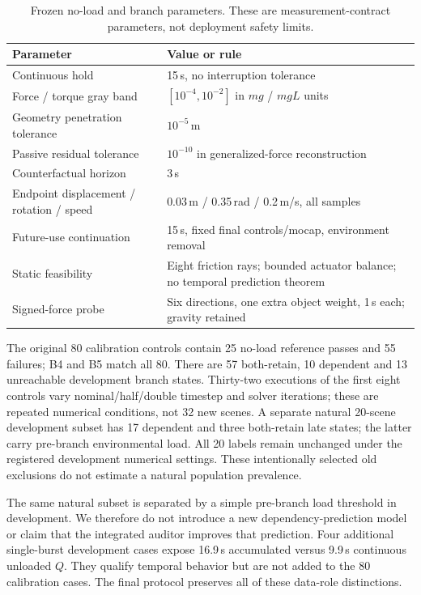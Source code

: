 \begin{table}[h]
\centering\small
\caption{Frozen no-load and branch parameters. These are measurement-contract
parameters, not deployment safety limits.}
\begin{tabularx}{\linewidth}{l Y}
\toprule
Parameter & Value or rule\\
\midrule
Continuous hold & 15\,s, no interruption tolerance\\
Force / torque gray band & $[10^{-4},10^{-2}]$ in $mg$ / $mgL$ units\\
Geometry penetration tolerance & $10^{-5}$\,m\\
Passive residual tolerance & $10^{-10}$ in generalized-force reconstruction\\
Counterfactual horizon & 3\,s\\
Endpoint displacement / rotation / speed & 0.03\,m / 0.35\,rad / 0.2\,m/s, all samples\\
Future-use continuation & 15\,s, fixed final controls/mocap, environment removal\\
Static feasibility & Eight friction rays; bounded actuator balance; no temporal prediction theorem\\
Signed-force probe & Six directions, one extra object weight, 1\,s each; gravity retained\\
\bottomrule
\end{tabularx}
\end{table}

The original 80 calibration controls contain 25 no-load reference passes and
55 failures; B4 and B5 match all 80. There are 57 both-retain, 10 dependent and
13 unreachable development branch states. Thirty-two executions of the first
eight controls vary nominal/half/double timestep and solver iterations; these
are repeated numerical conditions, not 32 new scenes. A separate natural
20-scene development subset has 17 dependent and three both-retain late states;
the latter carry pre-branch environmental load. All 20 labels remain unchanged
under the registered development numerical settings. These intentionally
selected old exclusions do not estimate a natural population prevalence.

The same natural subset is separated by a simple pre-branch load threshold in
development. We therefore do not introduce a new dependency-prediction model or
claim that the integrated auditor improves that prediction. Four additional
single-burst development cases expose 16.9\,s accumulated versus 9.9\,s
continuous unloaded $Q$. They qualify temporal behavior but are not added to
the 80 calibration cases. The final protocol preserves all of these data-role
distinctions.

